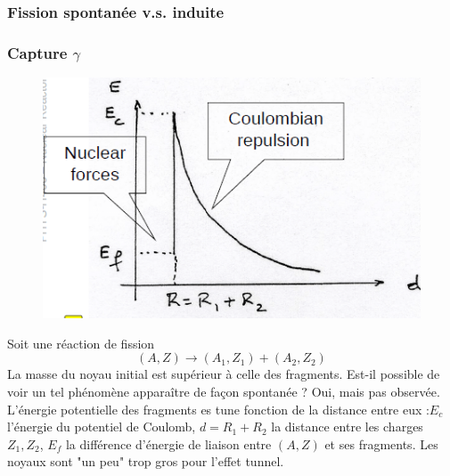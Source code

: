 \subsubsection{Fission spontanée v.s. induite}
\subsubsection{Capture $\gamma$}
	\begin{figure}
	\includegraphics[scale=0.6]{ch1/image10.png}
	\end{figure}
Soit une réaction de fission
\begin{equation}
(A,Z) \to (A_1,Z_1)+(A_2,Z_2)
\end{equation}
La masse du noyau initial est supérieur à celle des fragments. Est-il possible de voir un tel 
phénomène apparaître de façon spontanée ? Oui, mais pas observée. L'énergie potentielle des 
fragments es tune fonction de la distance entre eux :$E_c$ l'énergie du potentiel de Coulomb, $d
=R_1+R_2$ la distance entre les charges $Z_1,Z_2$, $E_f$ la différence d'énergie de liaison entre 
$(A,Z)$ et ses fragments. Les noyaux sont "un peu" trop gros pour l'effet tunnel. \\

